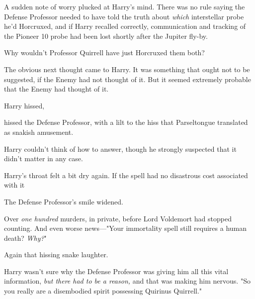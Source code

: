 A sudden note of worry plucked at Harry's mind. There was no rule saying the
Defense Professor needed to have told the truth about \emph{which} interstellar
probe he'd Horcruxed, and if Harry recalled correctly, communication and
tracking of the Pioneer 10 probe had been lost shortly after the Jupiter fly-by.

Why wouldn't Professor Quirrell have just Horcruxed them both?

The obvious next thought came to Harry. It was something that ought not to be
suggested, if the Enemy had not thought of it. But it seemed extremely probable
that the Enemy had thought of it.

 Harry hissed, 

 hissed the Defense Professor, with a lilt to the hiss
that Parseltongue translated as snakish amusement. 

Harry couldn't think of how to answer, though he strongly suspected that it
didn't matter in any case.


Harry's throat felt a bit dry again. If the spell had no disastrous cost
associated with it{\el} 

The Defense Professor's smile widened. 

Over \emph{one hundred} murders, in private, before Lord Voldemort had stopped
counting. And even worse news\mbox{---}"Your immortality spell still requires a human
death? \emph{Why?}"

 Again that hissing snake laughter.

Harry wasn't sure why the Defense Professor was giving him all this vital
information, \emph{but there had to be a reason,} and that was making him
nervous. "So you really are a disembodied spirit possessing Quirinus Quirrell."

